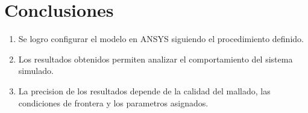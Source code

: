 \chapter{Conclusiones}
\begin{enumerate}
    \item Se logro configurar el modelo en ANSYS siguiendo el procedimiento definido.
    \item Los resultados obtenidos permiten analizar el comportamiento del sistema simulado.
    \item La precision de los resultados depende de la calidad del mallado, las condiciones de frontera y los parametros asignados.
\end{enumerate}

